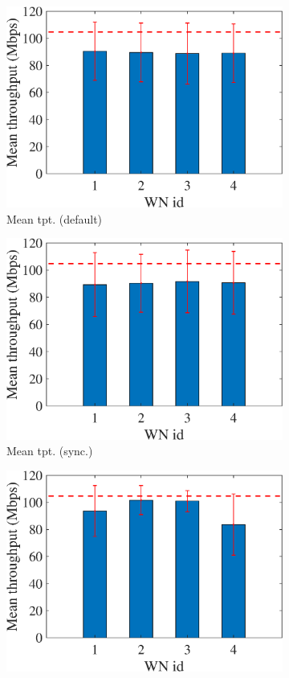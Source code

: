 \documentclass[preprint,12pt]{article}
\begin{document}
\begin{figure}[h!]
\begin{subfigure}[b]{.3\textwidth}
		\includegraphics[width=\textwidth]{images/mean_tpt_UCB}
		\caption{Mean tpt. (default)}\label{fig:mean_tpt_UCB}
	\end{subfigure}
	\begin{subfigure}[b]{.3\textwidth}
		\includegraphics[width=\textwidth]{images/mean_tpt_OUCB}
		\caption{Mean tpt. (sync.)}\label{fig:mean_tpt_OUCB}
	\end{subfigure}
	\begin{subfigure}[b]{.3\textwidth}
		\includegraphics[width=\textwidth]{images/mean_tpt_CUCB}

\end{subfigure}
\end{figure}
\end{document}
